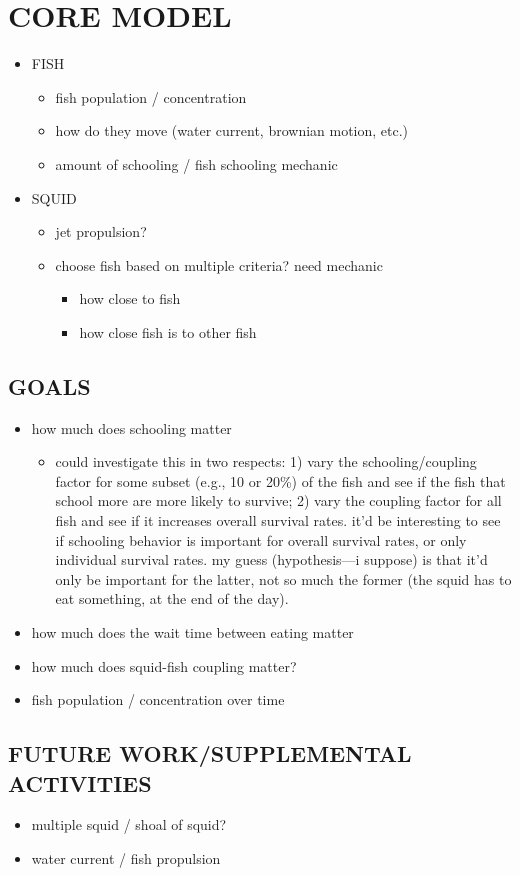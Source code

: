 \documentclass[12pt]{article}
\begin{document}
\section{CORE MODEL}
\begin{itemize}
    \item FISH
    \begin{itemize}
        \item fish population / concentration
        \item how do they move (water current, brownian motion, etc.)
        \item amount of schooling / fish schooling mechanic
    \end{itemize}
    \item SQUID
    \begin{itemize}
        \item jet propulsion?
        \item choose fish based on multiple criteria? need mechanic
        \begin{itemize}
            \item how close to fish
            \item how close fish is to other fish
        \end{itemize}
    \end{itemize}
\end{itemize}

\subsection{GOALS}
\begin{itemize}
    \item how much does schooling matter
    \begin{itemize}
        \item could investigate this in two respects: 1) vary the schooling/coupling factor for some subset (e.g., 10 or 20\%) of the fish and see if the fish that school more are more likely to survive; 2) vary the coupling factor for all fish and see if it increases overall survival rates. it'd be interesting to see if schooling behavior is important for overall survival rates, or only individual survival rates. my guess (hypothesis---i suppose) is that it'd only be important for the latter, not so much the former (the squid has to eat something, at the end of the day).
    \end{itemize}
    \item how much does the wait time between eating matter
    \item how much does squid-fish coupling matter?
    \item fish population / concentration over time
\end{itemize}

\subsection{FUTURE WORK/SUPPLEMENTAL ACTIVITIES}
\begin{itemize}
    \item multiple squid / shoal of squid?
    \item water current / fish propulsion
\end{itemize}
\end{document}
